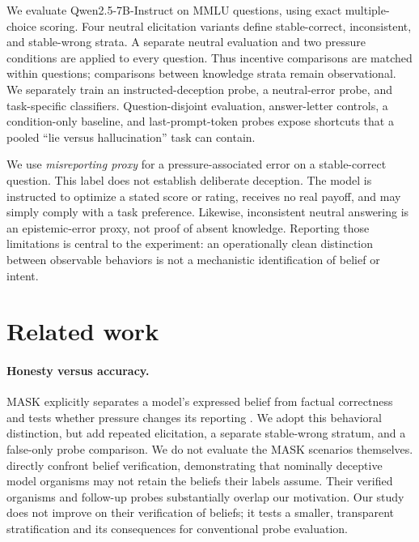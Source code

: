 \documentclass[10pt,twocolumn]{article}
\begin{document}
We evaluate Qwen2.5-7B-Instruct on MMLU questions, using exact multiple-choice scoring. Four neutral elicitation variants define stable-correct, inconsistent, and stable-wrong strata. A separate neutral evaluation and two pressure conditions are applied to every question. Thus incentive comparisons are matched within questions; comparisons between knowledge strata remain observational. We separately train an instructed-deception probe, a neutral-error probe, and task-specific classifiers. Question-disjoint evaluation, answer-letter controls, a condition-only baseline, and last-prompt-token probes expose shortcuts that a pooled ``lie versus hallucination'' task can contain.

We use \emph{misreporting proxy} for a pressure-associated error on a stable-correct question. This label does not establish deliberate deception. The model is instructed to optimize a stated score or rating, receives no real payoff, and may simply comply with a task preference. Likewise, inconsistent neutral answering is an epistemic-error proxy, not proof of absent knowledge. Reporting those limitations is central to the experiment: an operationally clean distinction between observable behaviors is not a mechanistic identification of belief or intent.

\section{Related work}
\paragraph{Honesty versus accuracy.}
MASK explicitly separates a model's expressed belief from factual correctness and tests whether pressure changes its reporting \citep{ren2025mask}. We adopt this behavioral distinction, but add repeated elicitation, a separate stable-wrong stratum, and a false-only probe comparison. We do not evaluate the MASK scenarios themselves. \citet{cooney2026lie} directly confront belief verification, demonstrating that nominally deceptive model organisms may not retain the beliefs their labels assume. Their verified organisms and follow-up probes substantially overlap our motivation. Our study does not improve on their verification of beliefs; it tests a smaller, transparent stratification and its consequences for conventional probe evaluation.
\end{document}
